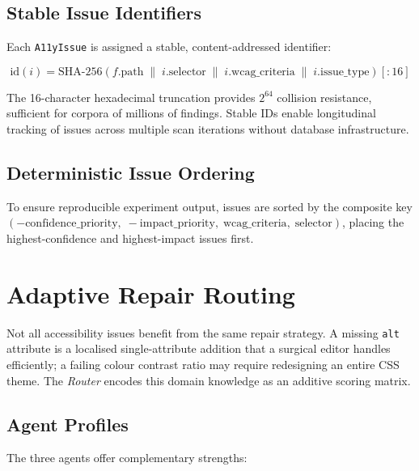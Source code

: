 \documentclass[10pt,conference]{IEEEtran}
\begin{document}
\subsection{Stable Issue Identifiers}

Each \texttt{A11yIssue} is assigned a stable, content-addressed identifier:

\begin{equation}
  \text{id}(i) = \text{SHA-256}(f.\text{path} \;\|\; i.\text{selector} \;\|\;
  i.\text{wcag\_criteria} \;\|\; i.\text{issue\_type})[:16]
  \label{eq:issueid}
\end{equation}

The 16-character hexadecimal truncation provides $2^{64}$ collision resistance,
sufficient for corpora of millions of findings.  Stable IDs enable
longitudinal tracking of issues across multiple scan iterations without
database infrastructure.

\subsection{Deterministic Issue Ordering}

To ensure reproducible experiment output, issues are sorted by the composite
key $(-\text{confidence\_priority},\; -\text{impact\_priority},\;
\text{wcag\_criteria},\; \text{selector})$, placing the highest-confidence and
highest-impact issues first.

\section{Adaptive Repair Routing}
\label{sec:router}

Not all accessibility issues benefit from the same repair strategy.  A missing
\texttt{alt} attribute is a localised single-attribute addition that a surgical
editor handles efficiently; a failing colour contrast ratio may require
redesigning an entire CSS theme.  The \emph{Router} encodes this domain
knowledge as an additive scoring matrix.

\subsection{Agent Profiles}

The three agents offer complementary strengths:
\end{document}
